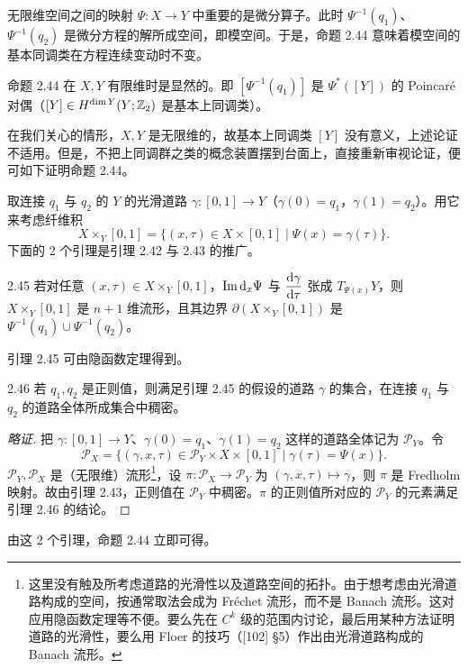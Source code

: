 无限维空间之间的映射 $\Psi\colon X\to Y$ 中重要的是微分算子。此时 $\Psi^{-1}(q_1)$、$\Psi^{-1}(q_2)$ 是微分方程的解所成空间，即模空间。于是，命题 2.44 意味着模空间的基本同调类在方程连续变动时不变。

命题 2.44 在 $X,Y$ 有限维时是显然的。即 $[\Psi^{-1}(q_1)]$ 是 $\Psi^*([Y])$ 的 Poincaré 对偶（$[Y]\in H^{\dim Y}(Y;\mathbb{Z}_2)$ 是基本上同调类）。

在我们关心的情形，$X,Y$ 是无限维的，故基本上同调类 $[Y]$ 没有意义，上述论证不适用。但是，不把上同调群之类的概念装置摆到台面上，直接重新审视论证，便可如下证明命题 2.44。

取连接 $q_1$ 与 $q_2$ 的 $Y$ 的光滑道路 $\gamma\colon[0,1]\to Y$（$\gamma(0)=q_1$，$\gamma(1)=q_2$）。用它来考虑纤维积
\[
  X\times_Y[0,1]=\{(x,\tau)\in X\times[0,1]\mid\Psi(x)=\gamma(\tau)\}.
\]
下面的 2 个引理是引理 2.42 与 2.43 的推广。

\begin{lemma}{2.45}
  若对任意 $(x,\tau)\in X\times_Y[0,1]$，$\operatorname{Im}\mathrm{d}_x\Psi$ 与 $\dfrac{\mathrm{d}\gamma}{\mathrm{d}\tau}$ 张成 $T_{\Psi(x)}Y$，则 $X\times_Y[0,1]$ 是 $n+1$ 维流形，且其边界 $\partial(X\times_Y[0,1])$ 是 $\Psi^{-1}(q_1)\cup\Psi^{-1}(q_2)$。
\end{lemma}

引理 2.45 可由隐函数定理得到。

\begin{lemma*}{2.46}
  若 $q_1,q_2$ 是正则值，则满足引理 2.45 的假设的道路 $\gamma$ 的集合，在连接 $q_1$ 与 $q_2$ 的道路全体所成集合中稠密。
\end{lemma*}

\begin{proof}[略证]
  把 $\gamma\colon[0,1]\to Y$、$\gamma(0)=q_1$、$\gamma(1)=q_2$ 这样的道路全体记为 $\mathcal{P}_Y$。令
  \[
    \mathcal{P}_X=\{(\gamma,x,\tau)\in\mathcal{P}_Y\times X\times[0,1]\mid\gamma(\tau)=\Psi(x)\}.
  \]
  $\mathcal{P}_Y,\mathcal{P}_X$ 是（无限维）流形\footnote{这里没有触及所考虑道路的光滑性以及道路空间的拓扑。由于想考虑由光滑道路构成的空间，按通常取法会成为 Fréchet 流形，而不是 Banach 流形。这对应用隐函数定理等不便。要么先在 $C^k$ 级的范围内讨论，最后用某种方法证明道路的光滑性，要么用 Floer 的技巧（[102] §5）作出由光滑道路构成的 Banach 流形。}，设 $\pi\colon\mathcal{P}_X\to\mathcal{P}_Y$ 为 $(\gamma,x,\tau)\mapsto\gamma$，则 $\pi$ 是 Fredholm 映射。故由引理 2.43，正则值在 $\mathcal{P}_Y$ 中稠密。$\pi$ 的正则值所对应的 $\mathcal{P}_Y$ 的元素满足引理 2.46 的结论。
\end{proof}

由这 2 个引理，命题 2.44 立即可得。

